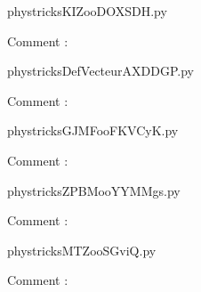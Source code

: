     \clearpage
    


    \newcommand{\CaptionFigKIZooDOXSDH}{<+Type your caption here+>}
    \begin{center}
        
    \end{center}
    phystricksKIZooDOXSDH.py

    Comment : 

    \clearpage
    


    \newcommand{\CaptionFigDefVecteurAXDDGP}{<+Type your caption here+>}
    \begin{center}
        
    \end{center}
    phystricksDefVecteurAXDDGP.py

    Comment : 

    \clearpage
    


    \newcommand{\CaptionFigGJMFooFKVCyK}{<+Type your caption here+>}
    \begin{center}
        
    \end{center}
    phystricksGJMFooFKVCyK.py

    Comment : 

    \clearpage
    


    \newcommand{\CaptionFigZPBMooYYMMgs}{<+Type your caption here+>}
    \begin{center}
        
    \end{center}
    phystricksZPBMooYYMMgs.py

    Comment : 

    \clearpage
    


    \newcommand{\CaptionFigMTZooSGviQ}{<+Type your caption here+>}
    \begin{center}
        
    \end{center}
    phystricksMTZooSGviQ.py

    Comment : 

    \clearpage
    


